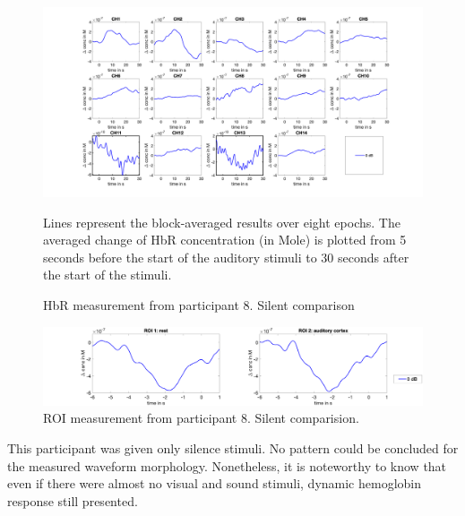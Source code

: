 \newpage

\begin{figure}[H]
  \centering
    \includegraphics[scale=.4]{bilder/HbR_Mole/sub_luca2_s_HbR.png}
  \caption{HbR measurement from participant 8. Silent comparison}
  \medskip
  \footnotesize {Lines represent the block-averaged results over eight epochs. The averaged change of HbR concentration (in Mole) is plotted from 5 seconds before the start of the auditory stimuli to 30 seconds after the start of the stimuli.}
\end{figure}

\begin{figure}[H]
  \centering
    \includegraphics[scale=.29]{bilder/ROI/sub_luca2_s_HbO.png}
  \caption{ROI measurement from participant 8. Silent comparision.}
\end{figure}

This participant was given only silence stimuli. No pattern could be concluded for the measured waveform morphology. Nonetheless, it is noteworthy to know that even if there were almost no visual and sound stimuli, dynamic hemoglobin response still presented.